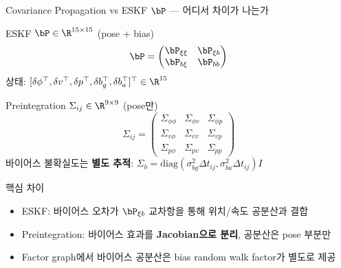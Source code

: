 \begin{frame}[shrink=10]{Covariance Propagation vs ESKF $\bP$ — 어디서 차이가 나는가}

  \begin{block}{ESKF $\bP \in \R^{15\times 15}$ (pose + bias)}
    \[
      \bP = \begin{pmatrix}
        \bP_{\xi\xi} & \bP_{\xi b} \\
        \bP_{b\xi}   & \bP_{bb}
      \end{pmatrix}
    \]
    상태: $[\delta\phi^\top, \delta v^\top, \delta p^\top, \delta b_g^\top, \delta b_a^\top]^\top \in \R^{15}$
  \end{block}

  \pause
  \begin{block}{Preintegration $\Sigma_{ij} \in \R^{9\times 9}$ (pose만)}
    \[
      \Sigma_{ij} = \begin{pmatrix}
        \Sigma_{\phi\phi} & \Sigma_{\phi v} & \Sigma_{\phi p} \\
        \Sigma_{v\phi} & \Sigma_{vv} & \Sigma_{vp} \\
        \Sigma_{p\phi} & \Sigma_{pv} & \Sigma_{pp}
      \end{pmatrix}
    \]
    바이어스 불확실도는 \textbf{별도 추적}: $\Sigma_b = \mathrm{diag}(\sigma_{bg}^2\Delta t_{ij}, \sigma_{ba}^2\Delta t_{ij})I$
  \end{block}

  \pause
  \begin{alertblock}{핵심 차이}
    \begin{itemize}
      \item ESKF: 바이어스 오차가 $\bP_{\xi b}$ 교차항을 통해 위치/속도 공분산과 결합
      \item Preintegration: 바이어스 효과를 \textbf{Jacobian으로 분리}, 공분산은 pose 부분만
      \item Factor graph에서 바이어스 공분산은 bias random walk factor가 별도로 제공
    \end{itemize}
  \end{alertblock}
\end{frame}

